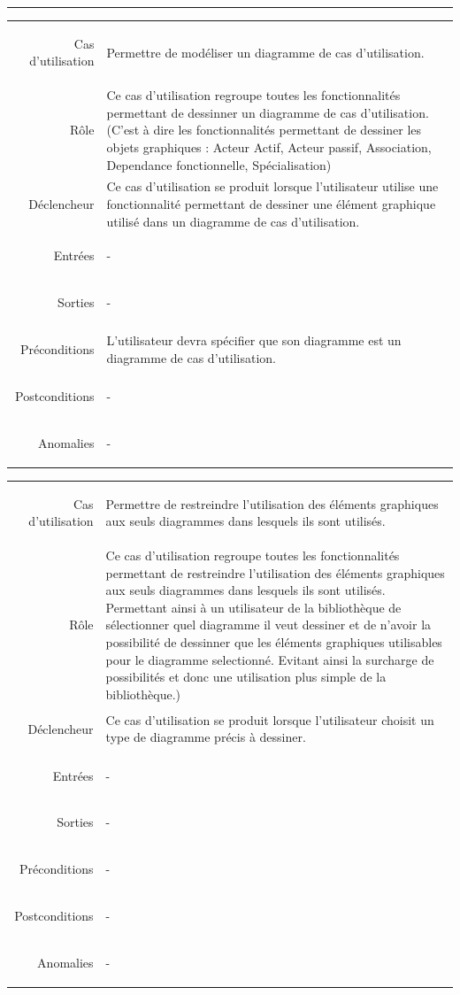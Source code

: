 \documentclass[12pt,a4paper,openany]{report}
\newcommand{\separateur}{\begin{center}\rule{12.6cm}{.5pt}\end{center}}
\begin{document}
	\separateur
	\begin{longtable}{>{\begin{bf}} r <{\end{bf}}!{:}p{13.5cm}}
	Cas d'utilisation & Permettre de modéliser un diagramme de cas d'utilisation.\\
	Rôle & Ce cas d'utilisation regroupe toutes les fonctionnalités permettant de dessinner un diagramme de cas d'utilisation.
	(C'est à dire les fonctionnalités permettant de dessiner les objets graphiques : Acteur Actif, Acteur passif, Association,
	Dependance fonctionnelle, Spécialisation)\\
	Déclencheur & Ce cas d'utilisation se produit lorsque l'utilisateur utilise une fonctionnalité permettant de dessiner une
	élément graphique utilisé dans un diagramme de cas d'utilisation.\\
	Entrées & -\\
	Sorties & -\\
	Préconditions & L'utilisateur devra spécifier que son diagramme est un diagramme de cas d'utilisation.\\
	Postconditions & -\\
	Anomalies & -\\
	\end{longtable}
	\begin{longtable}{>{\begin{bf}} r <{\end{bf}}!{:}p{13.5cm}}
	Cas d'utilisation & Permettre de restreindre l'utilisation des éléments graphiques aux seuls diagrammes dans lesquels ils sont utilisés.\\
	Rôle & Ce cas d'utilisation regroupe toutes les fonctionnalités permettant de restreindre l'utilisation des éléments
	graphiques aux seuls diagrammes dans lesquels ils sont utilisés. Permettant ainsi à un utilisateur de la bibliothèque de sélectionner quel
	diagramme il veut dessiner et de n'avoir la possibilité de dessinner que les éléments graphiques utilisables pour le diagramme selectionné.
	Evitant ainsi la surcharge de possibilités et donc une utilisation plus simple de la bibliothèque.)\\
	Déclencheur & Ce cas d'utilisation se produit lorsque l'utilisateur choisit un type de diagramme précis à dessiner.\\
	Entrées & -\\
	Sorties & -\\
	Préconditions & -\\
	Postconditions & -\\
	Anomalies & -\\
	\end{longtable}
\end{document}
